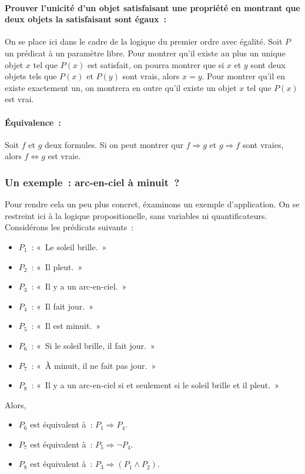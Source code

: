 \medskip

\paragraph{Prouver l'unicité d'un objet satisfaisant une propriété en montrant que deux objets la satisfaisant sont égaux :} 
    On se place ici dans le cadre de la logique du premier ordre avec égalité.
    Soit $P$ un prédicat à un paramètre libre. 
    Pour montrer qu'il existe au plus un unique objet $x$ tel que $P(x)$ est satisfait, on pourra montrer que si $x$ et $y$ sont deux objets tels que $P(x)$ et $P(y)$ sont vrais, alors $x = y$.
    Pour montrer qu'il en existe exactement un, on montrera en outre qu'il existe un objet $x$ tel que $P(x)$ est vrai.

\medskip

\paragraph{Équivalence :} 
    Soit $f$ et $g$ deux formules. 
    Si on peut montrer qur $f \Rightarrow g$ et $g \Rightarrow f$ sont vraies, alors $f \Leftrightarrow g$ est vraie.

\subsubsection{Un exemple : arc-en-ciel à minuit ?}

Pour rendre cela un peu plus concret, éxaminons un exemple d'application. 
On se restreint ici à la logique propositionelle, sans variables ni quantificateurs. 
Considérons les prédicats suivants : 
\begin{itemize}[nosep]
    \item $P_1$ : « Le soleil brille. »
    \item $P_2$ : « Il pleut. »
    \item $P_3$ : « Il y a un arc-en-ciel. »
    \item $P_4$ : « Il fait jour. »
    \item $P_5$ : « Il est minuit. »
    \item $P_6$ : « Si le soleil brille, il fait jour. »
    \item $P_7$ : « À minuit, il ne fait pas jour. »
    \item $P_8$ : « Il y a un arc-en-ciel si et seulement si le soleil brille et il pleut. »
\end{itemize}
Alors, 
\begin{itemize}[nosep]
    \item $P_6$ est équivalent à : $P_1 \Rightarrow P_4$.
    \item $P_7$ est équivalent à : $P_5 \Rightarrow \neg P_4$.
    \item $P_8$ est équivalent à : $P_3 \Rightarrow (P_1 \wedge P_2)$.
\end{itemize}

